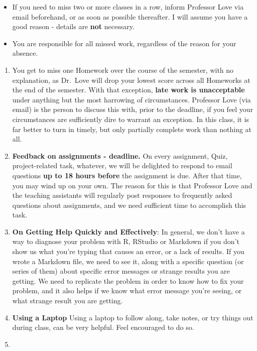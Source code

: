 \documentclass[
]{book}
\providecommand{\tightlist}{%
  \setlength{\itemsep}{0pt}\setlength{\parskip}{0pt}}
\begin{document}
\begin{itemize}
\tightlist
\item
  If you need to miss two or more classes in a row, inform Professor Love via email beforehand, or as soon as possible thereafter. I will assume you have a good reason - details are \textbf{not} necessary.
\item
  You are responsible for all missed work, regardless of the reason for your absence.
\end{itemize}

\begin{enumerate}
\def\labelenumi{\arabic{enumi}.}
\setcounter{enumi}{5}
\tightlist
\item
  You get to miss one Homework over the course of the semester, with no explanation, as Dr.~Love will drop your lowest score across all Homeworks at the end of the semester. With that exception, \textbf{late work is unacceptable} under anything but the most harrowing of circumstances. Professor Love (via email) is the person to discuss this with, prior to the deadline, if you feel your circumstances are sufficiently dire to warrant an exception. In this class, it is far better to turn in timely, but only partially complete work than nothing at all.
\item
  \textbf{Feedback on assignments - deadline.} On every assignment, Quiz, project-related task, whatever, we will be delighted to respond to email questions \textbf{up to 18 hours before} the assignment is due. After that time, you may wind up on your own. The reason for this is that Professor Love and the teaching assistants will regularly post responses to frequently asked questions about assignments, and we need sufficient time to accomplish this task.
\item
  \textbf{On Getting Help Quickly and Effectively}: In general, we don't have a way to diagnose your problem with R, RStudio or Markdown if you don't show us what you're typing that causes an error, or a lack of results. If you wrote a Markdown file, we need to see it, along with a specific question (or series of them) about specific error messages or strange results you are getting. We need to replicate the problem in order to know how to fix your problem, and it also helps if we know what error message you're seeing, or what strange result you are getting.
\item
  \textbf{Using a Laptop} Using a laptop to follow along, take notes, or try things out during class, can be very helpful. Feel encouraged to do so.
\item

\end{enumerate}
\end{document}
